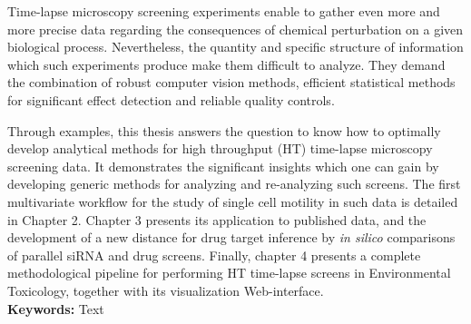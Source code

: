 \documentclass[11pt, oneside]{Thesis} %
\begin{document}
Time-lapse microscopy screening experiments enable to gather even more and more precise data regarding the consequences of chemical perturbation on a given biological process. Nevertheless, the quantity and specific structure of information which such experiments produce make them difficult to analyze. They demand the combination of robust computer vision methods, efficient statistical methods for significant effect detection and reliable quality controls.

Through examples, this thesis answers the question to know how to optimally develop analytical methods for high throughput (HT) time-lapse microscopy screening data. It demonstrates the significant insights which one can gain by developing generic methods for analyzing and re-analyzing such screens. The first multivariate workflow for the study of single cell motility in such data is detailed in Chapter 2. Chapter 3 presents its application to published data, and the development of a new distance for drug target inference by \textit{in silico} comparisons of parallel siRNA and drug screens.  Finally, chapter 4 presents a complete methodological pipeline for performing HT time-lapse screens in Environmental Toxicology, together with its visualization Web-interface.
\\
\noindent
{\large {\bf Keywords:}} Text
\end{document}
